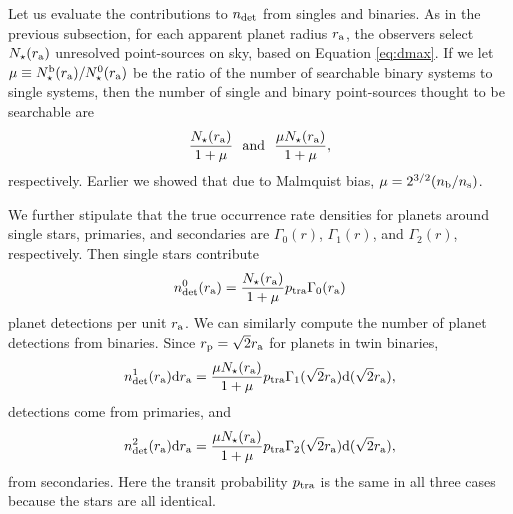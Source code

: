 \documentclass[12pt,modern]{aastex61}
\renewcommand{\a}{_{\rm a}}
\newcommand{\s}{_{\rm s}}
\newcommand{\p}{_{\rm p}}
\renewcommand{\b}{_{\rm b}}
\begin{document}
Let us evaluate the contributions to $n_{\rm det}$ from singles and
binaries.  As in the previous subsection, for each apparent planet
radius $r\a$, the observers select $N_\star(r\a)$ unresolved
point-sources on sky, based on Equation \ref{eq:dmax}.  If we let $\mu
\equiv N_\star^{\rm b}(r\a)/N_\star^0(r\a)$ be the ratio of the number
of searchable binary systems to single systems, then the number of
single and binary point-sources thought to be searchable are
\begin{equation}
  \frac{N_\star(r\a)}{1+\mu}~~{\rm and}~~\frac{\mu N_\star(r\a)}{1+\mu},
\end{equation}
respectively.  Earlier we showed that due to Malmquist bias, $\mu =
2^{3/2}(n\b/n\s)$.

We further stipulate that the true occurrence rate densities for
planets around single stars, primaries, and secondaries are
$\Gamma_0(r)$, $\Gamma_1(r)$, and $\Gamma_2(r)$, respectively.  
Then single stars contribute
\begin{equation}
  n_{\rm det}^0(r\a) = 
    {N_\star(r\a) \over {1+\mu}} p_{\rm tra} \Gamma_0(r\a)
  \label{eq:n0}
\end{equation}
planet detections per unit $r\a$.  We can similarly compute the number
of planet detections from binaries.  Since $r\p=\sqrt{2}r\a$ for
planets in twin binaries, 
\begin{equation}
  n_{\rm det}^1(r\a)\mathrm{d}r\a =
      {\mu N_\star(r\a) \over {1+\mu}} p_{\rm tra}
      \Gamma_1(\sqrt{2}r\a)\mathrm{d}(\sqrt{2}r\a),
	\label{eq:n1}
\end{equation}
detections come from primaries, and
\begin{equation}
  n_{\rm det}^2(r\a)\mathrm{d}r\a =
      {\mu N_\star(r\a) \over {1+\mu}} p_{\rm tra}
      \Gamma_2(\sqrt{2}r\a)\mathrm{d}(\sqrt{2}r\a),
	\label{eq:n2}
\end{equation}
from secondaries.  Here the transit probability $p_{\rm tra}$ is the
same in all three cases because the stars are all identical. 
\end{document}
